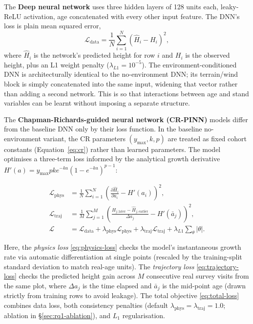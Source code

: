 \documentclass[11pt,a4paper]{report}
\begin{document}
The \textbf{Deep neural network} uses three hidden layers of 128 units each, leaky-ReLU activation, age concatenated with every other
input feature. The DNN's loss is plain mean squared error,
\begin{equation}
\mathcal{L}_{\text{data}} = \frac{1}{N}\sum_{i=1}^{N}\left(\hat H_i - H_i\right)^2,
\label{eq:data-loss}
\end{equation}
where $\hat H_i$ is the network's predicted height for row $i$ and $H_i$ is the observed height,
plus an L1 weight penalty ($\lambda_{L1}=10^{-5}$). The environment-conditioned DNN is
architecturally identical to the no-environment DNN; its terrain/wind block is simply concatenated
into the same input, widening that vector rather than adding a second network. This is so that interactions between age and stand variables can be learnt without imposing a separate structure. 


The \textbf{Chapman-Richards-guided neural network (CR-PINN)} models differ from the baseline DNN only by their loss function. In the baseline no-environment variant, the CR parameters $(y_{\max}, k, p)$ are treated as fixed cohort constants (Equation~\ref{eq:cr}) rather than learned parameters. The model optimises a three-term loss informed by the analytical growth derivative $H'(a) = y_{\max} p k e^{-ka}(1 - e^{-ka})^{p-1}$:

\begin{subequations}
\label{eq:cr-pinn-losses}
\begin{align}
\mathcal{L}_{\text{phys}} &= \frac{1}{N}\sum_{i=1}^{N}\left(\frac{\partial \hat{H}_i}{\partial a_i} - H'(a_i)\right)^2, \label{eq:physics-loss} \\
\mathcal{L}_{\text{traj}} &= \frac{1}{M}\sum_{j=1}^{M}\left(\frac{\hat{H}_{j,\text{later}} - \hat{H}_{j,\text{earlier}}}{\Delta a_j} - H'(\bar{a}_j)\right)^2, \label{eq:trajectory-loss} \\
\mathcal{L} &= \mathcal{L}_{\text{data}} + \lambda_{\text{phys}}\mathcal{L}_{\text{phys}} + \lambda_{\text{traj}}\mathcal{L}_{\text{traj}} + \lambda_{L1}\sum_{\theta}|\theta|. \label{eq:total-loss}
\end{align}
\end{subequations}

Here, the \emph{physics loss} \eqref{eq:physics-loss} checks the model's instantaneous growth rate via automatic differentiation at single points (rescaled by the training-split standard deviation to match real-age units). The \emph{trajectory loss} \eqref{eq:trajectory-loss} checks the predicted height gain across $M$ consecutive real survey visits from the same plot, where $\Delta a_j$ is the time elapsed and $\bar{a}_j$ is the mid-point age (drawn strictly from training rows to avoid leakage). The total objective \eqref{eq:total-loss} combines data loss, both consistency penalties (default $\lambda_{\text{phys}}=\lambda_{\text{traj}}=1.0$; ablation in \S\ref{sec:rq1-ablation}), and $L_1$ regularisation.
\end{document}
